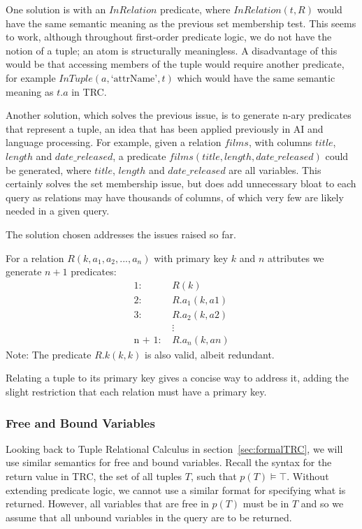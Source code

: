 \documentclass[a4paper, 11pt]{article}
\begin{document}
      One solution is with an $InRelation$ predicate, where $InRelation(t, R)$
      would have the same semantic meaning as the previous set membership test.
      This seems to work, although throughout first-order predicate logic, we
      do not have the notion of a tuple; an atom is structurally meaningless. A
      disadvantage of this would be that accessing members of the tuple would
      require another predicate, for example $InTuple(a, \text{`attrName'}, t)$
      which would have the same semantic meaning as $t.a$ in TRC.

      Another solution, which solves the previous issue, is to generate n-ary
      predicates that represent a tuple, an idea that has been applied
      previously in AI and language processing\cite{logicsemanticnetwork}. For example, given a relation $films$,
      with columns $title$, $length$ and $date\_released$, a predicate
      $films(title, length, date\_released)$ could be generated, where $title$,
      $length$ and $date\_released$ are all variables. This certainly solves
      the set membership issue, but does add unnecessary bloat to each
      query as relations may have thousands of columns, of which very few are
      likely needed in a given query.

      The solution chosen addresses the issues raised so far.

      For a relation $R(k, a_{1}, a_{2}, ..., a_{n})$ with primary key $k$
      and $n$ attributes we generate $n + 1$ predicates:
      \begin{align*}
        \text{1:  }      & R(k)           \\
        \text{2:  }      & R.a_1(k, a1)   \\
        \text{3:  }      & R.a_2(k, a2)   \\
                         & \vdots         \\
        \text{n + 1:  }  & R.a_n(k, an)
      \end{align*}
      Note: The predicate $R.k(k, k)$ is also valid, albeit redundant.

      Relating a tuple to its primary key gives a concise way to address it,
      adding the slight restriction that each relation must have a primary key.

    \subsubsection{Free and Bound Variables}
      \label{sec:freebound}
      Looking back to Tuple Relational Calculus in section~\ref{sec:formalTRC},
      we will use similar semantics for free and bound variables. Recall the
      syntax for the return value in TRC, the set of all tuples $T$, such that
      $p(T) \models \top$. Without extending predicate logic, we cannot use a
      similar format for specifying what is returned. However, all variables
      that are free in $p(T)$ must be in $T$ and so we assume that all unbound
      variables in the query are to be returned.
\end{document}
